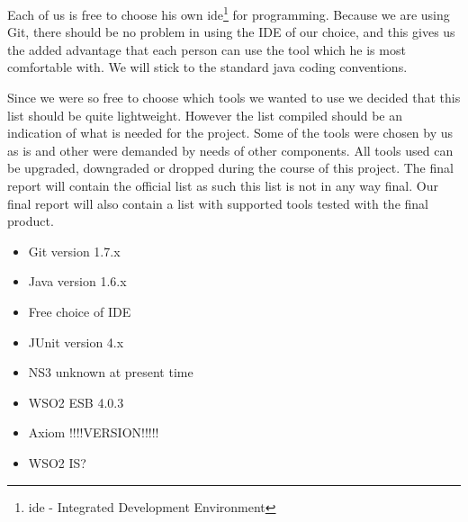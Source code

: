     Each of us is free to choose his own \gls{ide}\footnote{\gls{ide} - Integrated Development Environment} for programming. Because we are using Git, there should be no problem in using the IDE of our choice, and this gives us the added advantage that each person can use the tool which he is most comfortable with. We will stick to the standard \gls{java coding conventions}.
    
    Since we were so free to choose which tools we wanted to use we decided that this list should be quite lightweight. However the list compiled should be an indication of what is needed for the project. Some of the tools were chosen by us as is and other were demanded by needs of other components. All tools used can be  upgraded, downgraded or dropped during the course of this project. The final report will contain the official list as such this list is not in any way final. Our final report will also contain a list with supported tools tested with the final product.
    \begin{itemize}
        \item Git version 1.7.x
        \item Java version 1.6.x
        \item Free choice of IDE
        \item JUnit version 4.x
        \item NS3 unknown at present time
        \item WSO2 ESB 4.0.3
        \item Axiom !!!!VERSION!!!!!
        \item WSO2 IS?
    \end{itemize}
    

